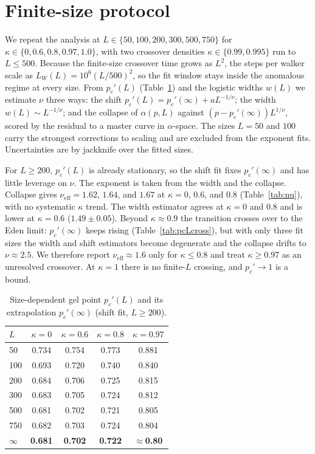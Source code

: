 \documentclass[aps,prl,twocolumn,superscriptaddress,floatfix,nofootinbib,longbibliography]{revtex4-2}
\newcommand{\pcp}{p_c'}
\newcommand{\kap}{\kappa}
\newcommand{\nueff}{\nu_{\mathrm{eff}}}
\begin{document}



\appendix
\section{Finite-size protocol}
\label{app:fss}
We repeat the analysis at $L\in\{50,100,200,300,500,750\}$ for
$\kap\in\{0,0.6,0.8,0.97,1.0\}$, with two crossover densities
$\kap\in\{0.99,0.995\}$ run to $L\le500$. Because the finite-size crossover
time grows as $L^2$, the steps per walker scale as $L_W(L)=10^6(L/500)^2$, so
the fit window stays inside the anomalous regime at every size. From
$\pcp(L)$ (Table~\ref{tab:pcL}) and the logistic widths $w(L)$ we estimate
$\nu$ three ways: the shift $\pcp(L)=\pcp(\infty)+aL^{-1/\nu}$; the width
$w(L)\sim L^{-1/\nu}$; and the collapse of $\alpha(p,L)$ against
$(p-\pcp(\infty))L^{1/\nu}$, scored by the residual to a master curve in
$\alpha$-space. The sizes $L=50$ and $100$ carry the strongest corrections to
scaling and are excluded from the exponent fits. Uncertainties are by jackknife
over the fitted sizes.

For $L\ge200$, $\pcp(L)$ is already stationary, so the shift fit fixes
$\pcp(\infty)$ and has little leverage on $\nu$. The exponent is taken from
the width and the collapse. Collapse gives $\nueff=1.62$, $1.64$, and $1.67$
at $\kap=0$, $0.6$, and $0.8$ (Table~\ref{tab:nu}), with no systematic $\kap$
trend. The width estimator agrees at $\kap=0$ and $0.8$ and is lower at
$\kap=0.6$ ($1.49\pm0.05$). Beyond $\kap\approx0.9$ the transition crosses over
to the Eden limit: $\pcp(\infty)$ keeps rising
(Table~\ref{tab:pcLcross}), but with only three fit sizes the width and shift
estimators become degenerate and the collapse drifts to $\nu\approx2.5$. We
therefore report $\nueff\approx1.6$ only for $\kap\le0.8$ and treat
$\kap\ge0.97$ as an unresolved crossover. At $\kap=1$ there is no finite-$L$
crossing, and $\pcp\to1$ is a bound.

\begin{table}[h]
\centering
\caption{Size-dependent gel point $\pcp(L)$ and its extrapolation
$\pcp(\infty)$ (shift fit, $L\ge200$).}
\label{tab:pcL}
\begin{tabular}{lcccc}
\toprule
$L$ & $\kap=0$ & $\kap=0.6$ & $\kap=0.8$ & $\kap=0.97$ \\
\midrule
50   & 0.734 & 0.754 & 0.773 & 0.881 \\
100  & 0.693 & 0.720 & 0.740 & 0.840 \\
200  & 0.684 & 0.706 & 0.725 & 0.815 \\
300  & 0.683 & 0.705 & 0.724 & 0.812 \\
500  & 0.681 & 0.702 & 0.721 & 0.805 \\
750  & 0.682 & 0.703 & 0.724 & 0.804 \\
\midrule
$\infty$ & \textbf{0.681} & \textbf{0.702} & \textbf{0.722} & \textbf{$\approx$0.80} \\
\bottomrule
\end{tabular}
\end{table}
\end{document}
